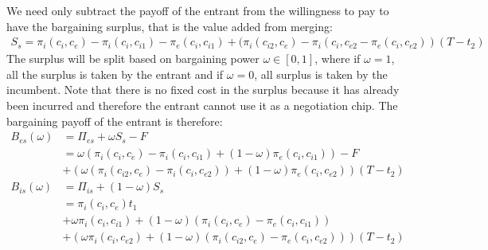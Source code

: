 We need only subtract the payoff of the entrant from the willingness to pay to have the bargaining surplus, that is the value added from merging:
\begin{align*}
S_s= \pi_i(c_i,c_{e})-\pi_i(c_i,c_{i1})-\pi_e(c_i,c_{i1})+(\pi_i(c_{i2},c_e)-\pi_i(c_{i},c_{e2}-\pi_e(c_{i},c_{e2}))(T-t_2) 
\end{align*}
The surplus will be split based on bargaining power $\omega \in [0,1]$, where if $\omega = 1$, all the surplus is taken by the entrant and if $\omega = 0$, all surplus is taken by the incumbent. Note that there is no fixed cost in the surplus because it has already been incurred and therefore the entrant cannot use it as a negotiation chip. The bargaining payoff of the entrant is therefore:
\begin{align*}
B_{es}(\omega) &= \Pi_{es}+ \omega S_s -F \\
&=\omega(\pi_i(c_i,c_{e})-\pi_i(c_i,c_{i1})+(1-\omega)\pi_e(c_i,c_{i1}))-F \\
&+(\omega(\pi_i(c_{i2},c_e)- \pi_i(c_{i},c_{e2}))+(1-\omega)\pi_e(c_{i},c_{e2}))(T-t_2) \\
B_{is}(\omega) &= \Pi_{is}+(1-\omega)S_s \\
& =\pi_i(c_i,c_{e})t_1 \\
&+\omega \pi_i(c_i,c_{i1})+(1-\omega)(\pi_i(c_i,c_{e})-\pi_e(c_i,c_{i1}))
\\&+(\omega \pi_i(c_i,c_{e2})+(1-\omega)(\pi_i(c_{i2},c_e)-\pi_e(c_{i},c_{e2})))(T-t_2)
\end{align*}
